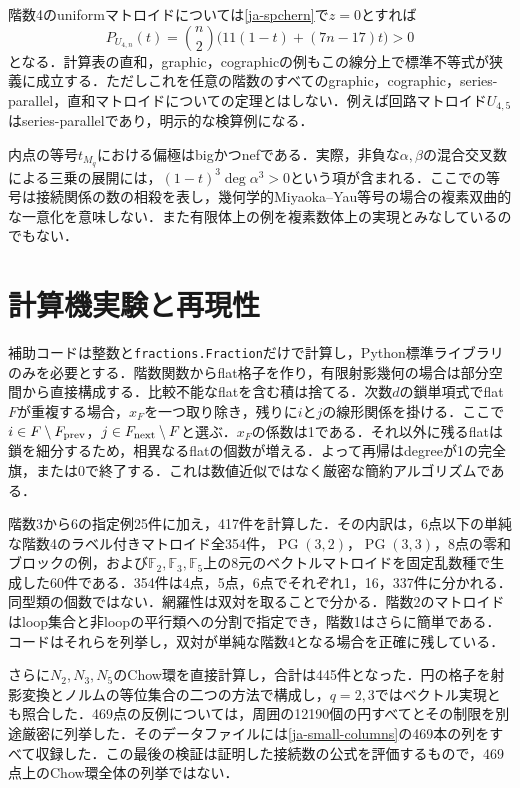 \documentclass[12pt]{amsart}
\theoremstyle{definition}
\theoremstyle{remark}
\numberwithin{equation}{section}
\begin{document}
階数4のuniformマトロイドについては\eqref{ja-spchern}で$z=0$とすれば
\[
 P_{U_{4,n}}(t)=\binom n2\bigl(11(1-t)+(7n-17)t\bigr)>0
\]
となる．計算表の直和，graphic，cographicの例もこの線分上で標準不等式が狭義に成立する．ただしこれを任意の階数のすべてのgraphic，cographic，series-parallel，直和マトロイドについての定理とはしない．例えば回路マトロイド$U_{4,5}$はseries-parallelであり，明示的な検算例になる．

内点の等号$t_{M_q}$における偏極はbigかつnefである．実際，非負な$\alpha,\beta$の混合交叉数による三乗の展開には，$(1-t)^3\deg\alpha^3>0$という項が含まれる．ここでの等号は接続関係の数の相殺を表し，幾何学的Miyaoka--Yau等号の場合の複素双曲的な一意化を意味しない．また有限体上の例を複素数体上の実現とみなしているのでもない．

\section{計算機実験と再現性}
補助コードは整数と\texttt{fractions.Fraction}だけで計算し，Python標準ライブラリのみを必要とする．階数関数からflat格子を作り，有限射影幾何の場合は部分空間から直接構成する．比較不能なflatを含む積は捨てる．次数$d$の鎖単項式でflat $F$が重複する場合，$x_F$を一つ取り除き，残りに$i$と$j$の線形関係を掛ける．ここで$i\in F\setminus F_{\rm prev}$，$j\in F_{\rm next}\setminus F$と選ぶ．$x_F$の係数は1である．それ以外に残るflatは鎖を細分するため，相異なるflatの個数が増える．よって再帰はdegreeが1の完全旗，または0で終了する．これは数値近似ではなく厳密な簡約アルゴリズムである．

階数3から6の指定例25件に加え，417件を計算した．その内訳は，6点以下の単純な階数4のラベル付きマトロイド全354件，$\operatorname{PG}(3,2)$，$\operatorname{PG}(3,3)$，8点の零和ブロックの例，および$\mathbb F_2,\mathbb F_3,\mathbb F_5$上の8元のベクトルマトロイドを固定乱数種で生成した60件である．354件は4点，5点，6点でそれぞれ1，16，337件に分かれる．同型類の個数ではない．網羅性は双対を取ることで分かる．階数2のマトロイドはloop集合と非loopの平行類への分割で指定でき，階数1はさらに簡単である．コードはそれらを列挙し，双対が単純な階数4となる場合を正確に残している．

さらに$N_2,N_3,N_5$のChow環を直接計算し，合計は445件となった．円の格子を射影変換とノルムの等位集合の二つの方法で構成し，$q=2,3$ではベクトル実現とも照合した．469点の反例については，周囲の12190個の円すべてとその制限を別途厳密に列挙した．そのデータファイルには\eqref{ja-small-columns}の469本の列をすべて収録した．この最後の検証は証明した接続数の公式を評価するもので，469点上のChow環全体の列挙ではない．
\end{document}
